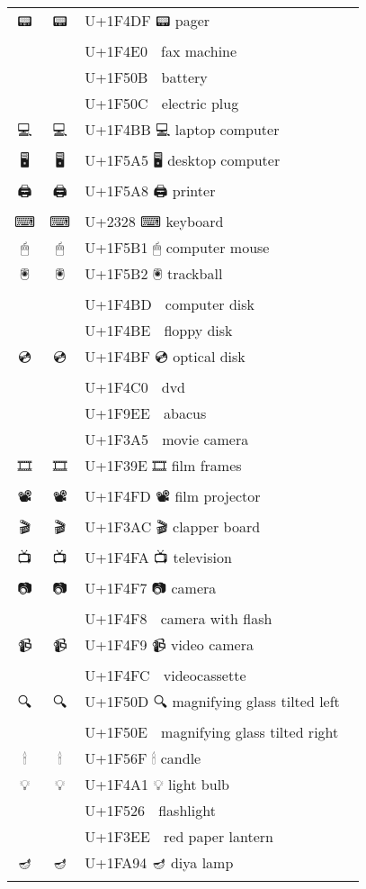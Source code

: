 \documentclass[a4paper,12pt]{article}
\newcommand{\fontA}[1]{{\fontspec[RawFeature={mode=harf,+dist,+ccmp}]{Segoe UI Emoji} #1}}
\newcommand{\fontB}[1]{{\fontspec[RawFeature={mode=harf,+dist,+ccmp}]{Noto Color Emoji} #1}}
\begin{document}
\begin{longtable}[c]{ccp{0.8\linewidth}}
\fontA{📟}&\fontB{📟}&U+1F4DF 📟 pager\\
\fontA{📠}&\fontB{📠}&U+1F4E0 📠 fax machine\\
\fontA{🔋}&\fontB{🔋}&U+1F50B 🔋 battery\\
\fontA{🔌}&\fontB{🔌}&U+1F50C 🔌 electric plug\\
\fontA{💻}&\fontB{💻}&U+1F4BB 💻 laptop computer\\
\fontA{🖥}&\fontB{🖥}&U+1F5A5 🖥 desktop computer\\
\fontA{🖨}&\fontB{🖨}&U+1F5A8 🖨 printer\\
\fontA{⌨}&\fontB{⌨}&U+2328 ⌨ keyboard\\
\fontA{🖱}&\fontB{🖱}&U+1F5B1 🖱 computer mouse\\
\fontA{🖲}&\fontB{🖲}&U+1F5B2 🖲 trackball\\
\fontA{💽}&\fontB{💽}&U+1F4BD 💽 computer disk\\
\fontA{💾}&\fontB{💾}&U+1F4BE 💾 floppy disk\\
\fontA{💿}&\fontB{💿}&U+1F4BF 💿 optical disk\\
\fontA{📀}&\fontB{📀}&U+1F4C0 📀 dvd\\
\fontA{🧮}&\fontB{🧮}&U+1F9EE 🧮 abacus\\
\fontA{🎥}&\fontB{🎥}&U+1F3A5 🎥 movie camera\\
\fontA{🎞}&\fontB{🎞}&U+1F39E 🎞 film frames\\
\fontA{📽}&\fontB{📽}&U+1F4FD 📽 film projector\\
\fontA{🎬}&\fontB{🎬}&U+1F3AC 🎬 clapper board\\
\fontA{📺}&\fontB{📺}&U+1F4FA 📺 television\\
\fontA{📷}&\fontB{📷}&U+1F4F7 📷 camera\\
\fontA{📸}&\fontB{📸}&U+1F4F8 📸 camera with flash\\
\fontA{📹}&\fontB{📹}&U+1F4F9 📹 video camera\\
\fontA{📼}&\fontB{📼}&U+1F4FC 📼 videocassette\\
\fontA{🔍}&\fontB{🔍}&U+1F50D 🔍 magnifying glass tilted left\\
\fontA{🔎}&\fontB{🔎}&U+1F50E 🔎 magnifying glass tilted right\\
\fontA{🕯}&\fontB{🕯}&U+1F56F 🕯 candle\\
\fontA{💡}&\fontB{💡}&U+1F4A1 💡 light bulb\\
\fontA{🔦}&\fontB{🔦}&U+1F526 🔦 flashlight\\
\fontA{🏮}&\fontB{🏮}&U+1F3EE 🏮 red paper lantern\\
\fontA{🪔}&\fontB{🪔}&U+1FA94 🪔 diya lamp\\

\end{longtable}
\end{document}
